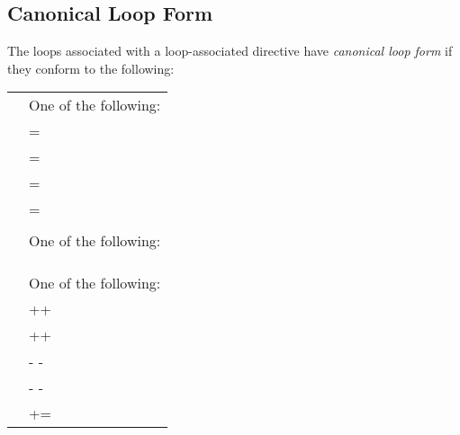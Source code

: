 \subsection{Canonical Loop Form}
\label{subsec:Canonical Loop Form}
\begin{ccppspecific}
The loops associated with a loop-associated directive have \emph{canonical loop form} 
if they conform to the following:

\medskip
\nolinenumbers
\renewcommand{\arraystretch}{1.0}
\tablelasttail{\hline}
\begin{supertabular}{ p{0.8in} p{4.5in}}
    {} & One of the following:\\
    & {} = {}\\
    & {} {} = {}\\
    & {} {} = {}\\
    & {} {} = {}\\
    & \\
    {} & One of the following:\\
    & {} {} {}\\
    & {} {} {}\\
    & \\
    {} & One of the following:\\
    & ++{}\\
    & {}++\\
    & {-} {-} {}\\
    & {} {-} {-}\\
    & {} += {}\\

\end{supertabular}
\end{ccppspecific}
